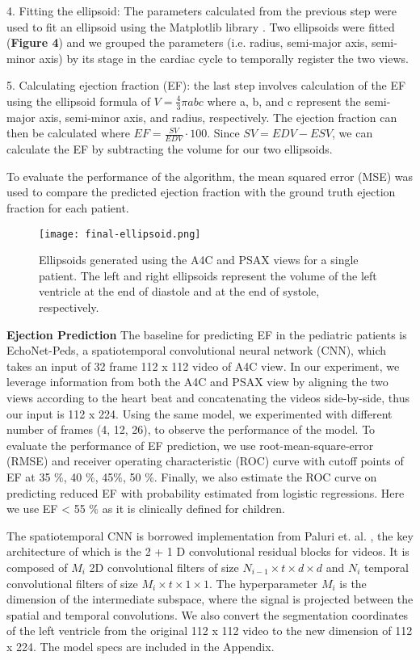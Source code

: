 \documentclass{article}
\begin{document}
4. Fitting the ellipsoid: The parameters calculated from the previous step were used to fit an ellipsoid using the Matplotlib library \cite{matplotlib}. Two ellipsoids were fitted (\textbf{Figure 4}) and we grouped the parameters (i.e. radius, semi-major axis, semi-minor axis) by its stage in the cardiac cycle to temporally register the two views. 

5. Calculating ejection fraction (EF): the last step involves calculation of the EF using the ellipsoid formula of $V=\frac{4}{3}\pi abc$ where a, b, and c represent the semi-major axis, semi-minor axis, and radius, respectively. The ejection fraction can then be calculated where $EF = 
\frac{SV}{EDV} \cdot 100$. Since $SV = EDV - ESV$, we can calculate the EF by subtracting the volume for our two ellipsoids. 

To evaluate the performance of the algorithm, the mean squared error (MSE) was used to compare the predicted ejection fraction with the ground truth ejection fraction for each patient. 

\begin{figure} [H]
  \centering
  \texttt{[image: final-ellipsoid.png]}
  \caption{Ellipsoids generated using the A4C and PSAX views
for a single patient. The left and right ellipsoids represent the volume of the left ventricle at the end
of diastole and at the end of
systole, respectively.}
\end{figure}

\noindent\textbf{Ejection Prediction}
The baseline for predicting EF in the pediatric patients is EchoNet-Peds, a spatiotemporal convolutional neural network (CNN), which takes an input of 32 frame 112 x 112 video of A4C view. In our experiment, we leverage information from both the A4C and PSAX view by aligning the two views according to the heart beat and concatenating the videos side-by-side, thus our input is 112 x 224. Using the same model, we experimented with different number of frames (4, 12, 26), to observe the performance of the model. To evaluate the performance of EF prediction, we use root-mean-square-error (RMSE) and receiver operating characteristic (ROC) curve with cutoff points of EF at 35 $\%$, 40 $\%$, 45$\%$, 50 $\%$. Finally, we also estimate the ROC curve on predicting reduced EF with probability estimated from logistic regressions. Here we use EF < 55 $\%$ as it is clinically defined for children.\cite{hf}

The spatiotemporal CNN is borrowed implementation from Paluri et. al. \cite{stcnn}, the key architecture of which is the  2 + 1 D convolutional residual blocks for videos. It is composed of $M_i$ 2D convolutional filters of size $N_{i-1} \times t \times d \times d$ and $N_i$ temporal convolutional filters of size $M_i \times t \times 1 \times 1$. The hyperparameter $M_i$ is the dimension of the intermediate subspace, where the signal is projected between the spatial and temporal convolutions. We also convert the segmentation coordinates of the left ventricle from the original 112 x 112 video to the new dimension of 112 x 224. The model specs are included in the Appendix.
\end{document}
